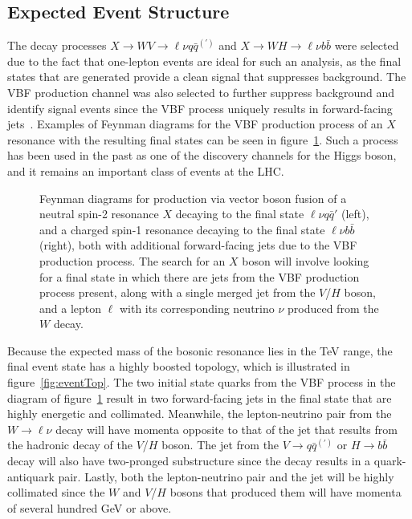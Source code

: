 \subsection{Expected Event Structure}
\label{subsec:expEvent}

The decay processes $X\to WV\to\ell\nu q\bar{q}^{(\prime)}$ and $X\to WH\to\ell\nu b\bar{b}$ were selected due to the fact that one-lepton events are ideal for such an analysis, as the final states that are generated provide a clean signal that suppresses background.
The VBF production channel was also selected to further suppress background and identify signal events since the VBF process uniquely results in forward-facing jets~\cite{rauch2016vectorboson}.
Examples of Feynman diagrams for the VBF production process of an $X$ resonance with the resulting final states can be seen in figure~\ref{fig:vbfFeynman}.
Such a process has been used in the past as one of the discovery channels for the Higgs boson, and it remains an important class of events at the LHC.

\begin{figure}[htbp]
  \centering
  
  \caption{
    Feynman diagrams for production via vector boson fusion of a neutral spin-2 resonance $X$ decaying to the final state $\ell\nu q\bar{q}'$ (left), and a charged spin-1 resonance decaying to the final state $\ell\nu b\bar{b}$ (right), both with additional forward-facing jets due to the VBF production process.
    The search for an $X$ boson will involve looking for a final state in which there are jets from the VBF production process present, along with a single merged jet from the $V$/$H$ boson, and a lepton $\ell$ with its corresponding neutrino $\nu$ produced from the $W$ decay.
  }
  \label{fig:vbfFeynman}
\end{figure}

Because the expected mass of the bosonic resonance lies in the TeV range, the final event state has a highly boosted topology, which is illustrated in figure~\ref{fig:eventTop}.
The two initial state quarks from the VBF process in the diagram of figure~\ref{fig:vbfFeynman} result in two forward-facing jets in the final state that are highly energetic and collimated.
Meanwhile, the lepton-neutrino pair from the $W\to\ell\nu$ decay will have momenta opposite to that of the jet that results from the hadronic decay of the $V$/$H$ boson.
The jet from the $V\to q\bar{q}^{(\prime)}$ or $H\to b\bar{b}$ decay will also have two-pronged substructure since the decay results in a quark-antiquark pair.
Lastly, both the lepton-neutrino pair and the jet will be highly collimated since the $W$ and $V$/$H$ bosons that produced them will have momenta of several hundred GeV or above.

